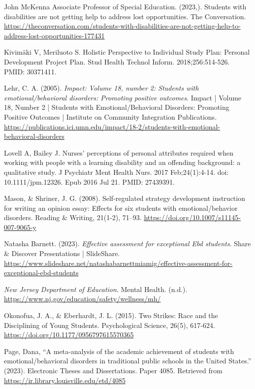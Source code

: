 \documentclass[11pt]{article}
\begin{document}
\begin{references}[Reference]
\item John McKenna Associate Professor of Special Education. (2023,). Students with disabilities are not getting help to address lost opportunities. The Conversation. \url{https://theconversation.com/students-with-disabilities-are-not-getting-help-to-address-lost-opportunities-177431}
\item Kivimäki V, Meriluoto S. Holistic Perspective to Individual Study Plan: Personal Development Project Plan. Stud Health Technol Inform. 2018;256:514-526. PMID: 30371411.
\item Lehr, C. A. (2005). \textit{Impact: Volume 18, number 2: Students with emotional/behavioral disorders: Promoting positive outcomes}. Impact | Volume 18, Number 2 | Students with Emotional/Behavioral Disorders: Promoting Positive Outcomes | Institute on Community Integration Publications. \url{https://publications.ici.umn.edu/impact/18-2/students-with-emotional-behavioral-disorders}
\item Lovell A, Bailey J. Nurses' perceptions of personal attributes required when working with people with a learning disability and an offending background: a qualitative study. J Psychiatr Ment Health Nurs. 2017 Feb;24(1):4-14. doi: 10.1111/jpm.12326. Epub 2016 Jul 21. PMID: 27439391.
\item Mason, \& Shriner, J. G. (2008). Self-regulated strategy development instruction for writing an opinion essay: Effects for six students with emotional/behavior disorders. Reading \& Writing, 21(1-2), 71--93. \url{https://doi.org/10.1007/s11145-007-9065-y}
\item Natasha Barnett. (2023). \textit{Effective assessment for exceptional Ebd students}. Share \& Discover Presentations | SlideShare. \url{https://www.slideshare.net/natashabarnettmiamig/effective-assessment-for-exceptional-ebd-students}
\item \textit{New Jersey Department of Education}. Mental Health. (n.d.). \url{https://www.nj.gov/education/safety/wellness/mh/}
\item Okonofua, J. A., \& Eberhardt, J. L. (2015). Two Strikes: Race and the Disciplining of Young Students. Psychological Science, 26(5), 617-624. \url{https://doi.org/10.1177/0956797615570365}
\item Page, Dana, ``A meta-analysis of the academic achievement of students with emotional/behavioral disorders in traditional public schools in the United States.'' (2023). Electronic Theses and Dissertations. Paper 4085. Retrieved from \url{https://ir.library.louisville.edu/etd/4085}

\end{references}
\end{document}
